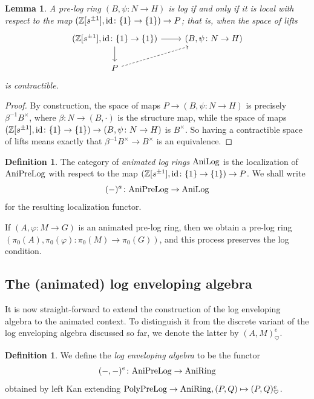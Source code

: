 \documentclass[a4paper,10pt%
]{amsart}
\numberwithin{equation}{section}
\newtheorem{lemma}[subsection]{Lemma}
\theoremstyle{definition}
\newtheorem{definition}[subsection]{Definition}
\renewcommand{\:}{\colon}
\begin{document}
\begin{lemma}\label{lem:contractiblelift} A pre-log ring $(B, \psi \colon N \to H)$ is log if and only if it is local with respect to the map $({\Bbb Z}[s^{\pm 1}], {\rm id} \colon \{1\} \to \{1\}) \to P$; that is, when the space of lifts \[\begin{tikzcd}({\Bbb Z}[s^{\pm 1}], {\rm id} \colon \{1\} \to \{1\}) \ar{d} \ar{r} & (B, \psi \colon N \to H) \\ P \ar[dashed]{ur}\end{tikzcd}\] is contractible.
\end{lemma}

\begin{proof} By construction, the space of maps $P \to (B, \psi \colon N \to H)$ is precisely $\beta^{-1}B^\times$, where $\beta \colon N \to (B, \cdot)$ is the structure map, while the space of maps $({\Bbb Z}[s^{\pm 1}], {\rm id} \colon \{1\} \to \{1\}) \to (B, \psi \colon N \to H)$ is $B^\times$. So having a contractible space of lifts means exactly that $\beta^{-1}B^\times \to B^\times$ is an equivalence. 
\end{proof}

\begin{definition} The category of \emph{animated log rings} ${\rm AniLog}$ is the localization of ${\rm AniPreLog}$ with respect to the map $({\Bbb Z}[s^{\pm 1}], {\rm id} \colon \{1\} \to \{1\}) \to P$. We shall write \[(-)^a \colon {\rm AniPreLog} \to {\rm AniLog}\] for the resulting localization functor. 
\end{definition}

If $(A, \varphi \colon M \to G)$ is an animated pre-log ring, then we obtain a pre-log ring $(\pi_0(A), \pi_0(\varphi) \colon \pi_0(M) \to \pi_0(G))$, and this process preserves the log condition. 

\subsection{The (animated) log enveloping algebra} It is now straight-forward to extend the construction of the log enveloping algebra to the animated context. To distinguish it from the discrete variant of the log enveloping algebra discussed so far, we denote the latter by $(A, M)^e_{\heartsuit}$. 

\begin{definition} We define the \emph{log enveloping algebra} to be the functor \[(-, -)^e \colon {\rm AniPreLog} \to {\rm AniRing}\] obtained by left Kan extending ${\rm PolyPreLog} \to {\rm AniRing}, (P, Q) \mapsto (P, Q)^e_{\heartsuit}$. 
\end{definition}
\end{document}
